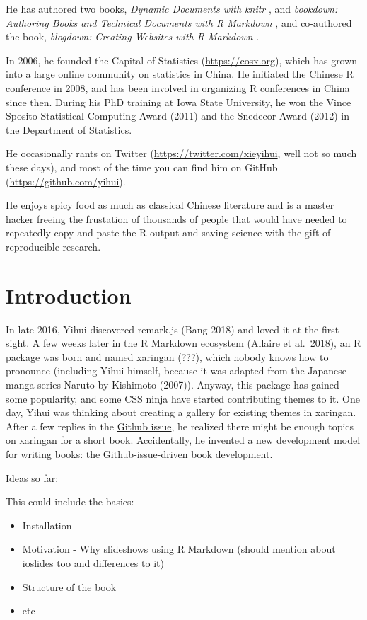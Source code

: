 \documentclass[
]{book}
\providecommand{\tightlist}{%
  \setlength{\itemsep}{0pt}\setlength{\parskip}{0pt}}
\begin{document}
He has authored two books, \emph{Dynamic Documents with knitr} \citep{xie2015}, and \emph{bookdown: Authoring Books and Technical Documents with R Markdown} \citep{xie2016}, and co-authored the book, \emph{blogdown: Creating Websites with R Markdown} \citep{xie2017}.

In 2006, he founded the Capital of Statistics (\url{https://cosx.org}), which has grown into a large online community on statistics in China. He initiated the Chinese R conference in 2008, and has been involved in organizing R conferences in China since then. During his PhD training at Iowa State University, he won the Vince Sposito Statistical Computing Award (2011) and the Snedecor Award (2012) in the Department of Statistics.

He occasionally rants on Twitter (\url{https://twitter.com/xieyihui}, well not so much these days), and most of the time you can find him on GitHub (\url{https://github.com/yihui}).

He enjoys spicy food as much as classical Chinese literature and is a master hacker freeing the frustation of thousands of people that would have needed to repeatedly copy-and-paste the R output and saving science with the gift of reproducible research.

\hypertarget{intro}{%
\chapter{Introduction}\label{intro}}

In late 2016, Yihui discovered remark.js (Bang 2018) and loved it at the first sight. A few weeks later in the R Markdown ecosystem (Allaire et al.~2018), an R package was born and named xaringan (???), which nobody knows how to pronounce (including Yihui himself, because it was adapted from the Japanese manga series Naruto by Kishimoto (2007)). Anyway, this package has gained some popularity, and some CSS ninja have started contributing themes to it. One day, Yihui was thinking about creating a gallery for existing themes in xaringan. After a few replies in the \href{https://github.com/yihui/xaringan/issues/172\#issuecomment-434065692}{Github issue}, he realized there might be enough topics on xaringan for a short book. Accidentally, he invented a new development model for writing books: the Github-issue-driven book development.

Ideas so far:

This could include the basics:

\begin{itemize}
\tightlist
\item
  Installation
\item
  Motivation - Why slideshows using R Markdown (should mention about ioslides too and differences to it)
\item
  Structure of the book
\item
  etc
\end{itemize}
\end{document}
